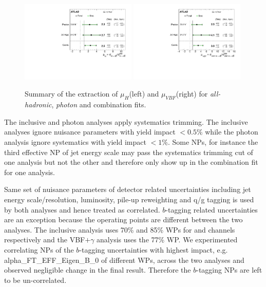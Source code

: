 \begin{figure}[htbp]
  \centering
  \includegraphics[width=0.49\textwidth]{figures/VBF/Plot_mu_summary_VBF.pdf}
  \includegraphics[width=0.49\textwidth]{figures/VBF/Plot_mu_summary_VBFonly.pdf}

\caption{Summary of the extraction of $\mu_{H}$(left) and $\mu_{VBF}$(right) for  \textit{all-hadronic}, \textit{photon} and combination fits.}
  \label{fig:vbf-summary}
\end{figure}





The inclusive and photon analyses apply systematics trimming. The inclusive analyses ignore nuisance parameters with yield impact $<0.5\%$ while the photon analysis ignore systematics with yield impact $<1\%$. Some NPs, for instance the third effective NP of jet energy scale may pass the systematics trimming cut of one analysis but not the other and therefore only show up in the combination fit for one analysis. 

Same set of nuisance parameters of detector related uncertainties including jet energy scale/resolution, luminosity, pile-up reweighting and q/g tagging is used by both analyses and hence treated as correlated.  $b$-tagging related uncertainties are an exception because the operating points are different between the two analyses. The inclusive analysis uses 70\% and 85\% WPs for \twocentral and \fourcentral channels respectively and the VBF$+\gamma$ analysis uses the 77\% WP. We experimented correlating NPs of the $b$-tagging uncertainties with highest impact, e.g. alpha\_FT\_EFF\_Eigen\_B\_0 of different WPs, across the two analyses and observed negligible change in the final result. Therefore the $b$-tagging NPs are left to be un-correlated.

